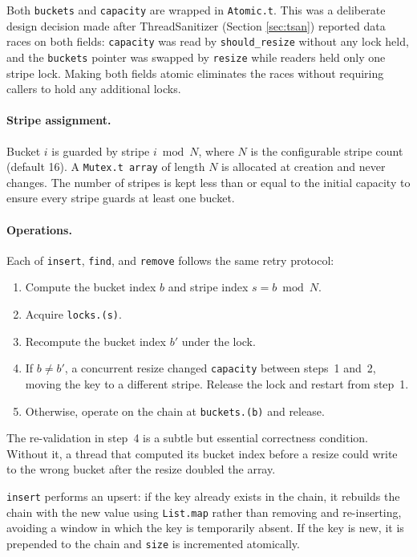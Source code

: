 \documentclass[11pt,a4paper]{article}
\begin{document}
Both \texttt{buckets} and \texttt{capacity} are wrapped in \texttt{Atomic.t}.
This was a deliberate design decision made after ThreadSanitizer (Section
\ref{sec:tsan}) reported data races on both fields: \texttt{capacity} was read
by \texttt{should\_resize} without any lock held, and the \texttt{buckets}
pointer was swapped by \texttt{resize} while readers held only one stripe lock.
Making both fields atomic eliminates the races without requiring callers to hold
any additional locks.

\paragraph{Stripe assignment.}
Bucket $i$ is guarded by stripe $i \bmod N$, where $N$ is the configurable
stripe count (default 16). A \texttt{Mutex.t array} of length $N$ is allocated
at creation and never changes. The number of stripes is kept less than or equal
to the initial capacity to ensure every stripe guards at least one bucket.

\paragraph{Operations.}
Each of \texttt{insert}, \texttt{find}, and \texttt{remove} follows the same
retry protocol:
\begin{enumerate}
  \item Compute the bucket index $b$ and stripe index $s = b \bmod N$.
  \item Acquire \texttt{locks.(s)}.
  \item Recompute the bucket index $b'$ under the lock.
  \item If $b \neq b'$, a concurrent resize changed \texttt{capacity} between
        steps~1 and~2, moving the key to a different stripe. Release the lock
        and restart from step~1.
  \item Otherwise, operate on the chain at \texttt{buckets.(b)} and release.
\end{enumerate}

The re-validation in step~4 is a subtle but essential correctness condition.
Without it, a thread that computed its bucket index before a resize could
write to the wrong bucket after the resize doubled the array.

\texttt{insert} performs an upsert: if the key already exists in the chain, it
rebuilds the chain with the new value using \texttt{List.map} rather than
removing and re-inserting, avoiding a window in which the key is temporarily
absent. If the key is new, it is prepended to the chain and \texttt{size} is
incremented atomically.
\end{document}
